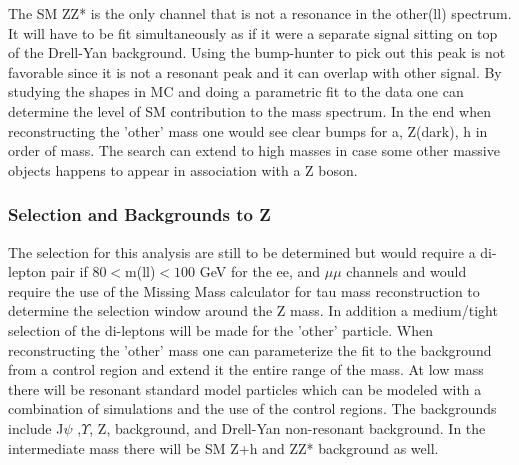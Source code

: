 



The SM ZZ* is the only channel that is not a resonance in the other(ll) spectrum.  It will have to be fit simultaneously as if it were a separate signal sitting on top of the Drell-Yan background.  Using the
bump-hunter to pick out this peak is not favorable since it is not a resonant peak and it can overlap with other signal.  By studying the shapes in MC and doing a parametric fit to the data one can determine the level of SM contribution to the mass spectrum.
In the end when reconstructing the 'other' mass one would see clear bumps for a, Z(dark), h in order of mass. The search can extend to high masses in case some other massive objects happens to appear in association with a Z boson.  


\subsubsection{Selection and Backgrounds to Z }
\label{sec:zscanback}
The selection for this analysis are still to be determined but would require a di-lepton pair if  $80<$m(ll)$<100$ GeV for the ee, and $\mu\mu$ channels and would require the use of the Missing Mass calculator for tau mass
reconstruction to determine the selection window around the Z mass.  In addition a medium/tight selection of the di-leptons will be made for the 'other' particle. 
When reconstructing the 'other' mass one can parameterize the fit to the background from a control region and extend it the entire range of the mass.  At low mass there will be resonant standard model particles which can be modeled with a combination of simulations and the use of the control regions.
The backgrounds include J$\psi$ ,$\Upsilon$, Z, \ttbar background, and Drell-Yan non-resonant background. In the intermediate mass there will be SM Z+h and ZZ* background as well.



